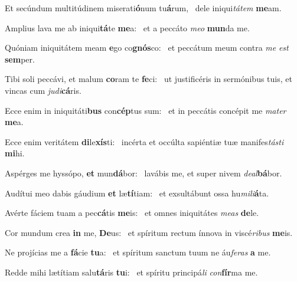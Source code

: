 \item Et secúndum multitúdinem miserati\textbf{ó}num tu\textbf{á}rum,~\psstar{} dele iniqui\textit{tá}\textit{tem} \textbf{me}am.

\item Amplius lava me ab iniqui\textbf{tá}te \textbf{me}a:~\psstar{} et a peccáto \textit{me}\textit{o} \textbf{mun}da me.

\item Quóniam iniquitátem meam \textbf{e}go co\textbf{gnós}co:~\psstar{} et peccátum meum contra \textit{me} \textit{est} \textbf{sem}per.

\item Tibi soli peccávi, et malum \textbf{co}ram te \textbf{fe}ci:~\psstar{} ut justificéris in sermónibus tuis, et vincas cum \textit{ju}\textit{di}\textbf{cá}ris.

\item Ecce enim in iniquitáti\textbf{bus} con\textbf{cép}tus sum:~\psstar{} et in peccátis concépit me \textit{ma}\textit{ter} \textbf{me}a.

\item Ecce enim veritátem \textbf{di}le\textbf{xís}ti:~\psstar{} incérta et occúlta sapiéntiæ tuæ manifes\textit{tás}\textit{ti} \textbf{mi}hi.

\item Aspérges me hyssópo, \textbf{et} mun\textbf{dá}bor:~\psstar{} lavábis me, et super nivem \textit{de}\textit{al}\textbf{bá}bor.

\item Audítui meo dabis gáudium \textbf{et} læ\textbf{tí}tiam:~\psstar{} et exsultábunt ossa hu\textit{mi}\textit{li}\textbf{á}ta.

\item Avérte fáciem tuam a pec\textbf{cá}tis \textbf{me}is:~\psstar{} et omnes iniquitátes \textit{me}\textit{as} \textbf{de}le.

\item Cor mundum crea \textbf{in} me, \textbf{De}us:~\psstar{} et spíritum rectum ínnova in viscé\textit{ri}\textit{bus} \textbf{me}is.

\item Ne projícias me a \textbf{fá}cie \textbf{tu}a:~\psstar{} et spíritum sanctum tuum ne áu\textit{fe}\textit{ras} \textbf{a} me.

\item Redde mihi lætítiam salu\textbf{tá}ris \textbf{tu}i:~\psstar{} et spíritu principá\textit{li} \textit{con}\textbf{fír}ma me.

